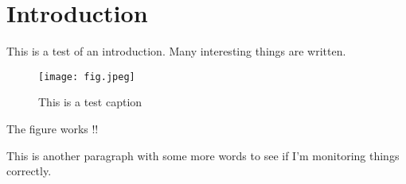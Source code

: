 \chapter{Introduction}
\label{ch:intro}

This is a test of an introduction. Many interesting things are written.

\begin{figure}[h]
	\centering
	\texttt{[image: fig.jpeg]}
	\caption{This is a test caption}
	\label{fig:testfig}
\end{figure}

The figure works !! \cite{feynman2018space}

This is another paragraph with some more words to see if I'm monitoring things correctly.
